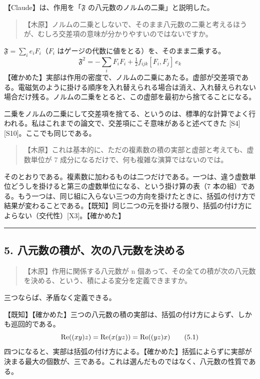 \documentclass[
  a4paper,
]{ltjsarticle}
\begin{document}
【Claude】は、作用を「\(\mathfrak{F}\)
の八元数のノルムの二乗」と説明した。

\begin{quote}
【木原】ノルムの二乗としないで、そのまま八元数の二乗と考えるほうが、むしろ交差項の意味が分かりやすいのではないですか。
\end{quote}

\(\mathfrak{F} = \sum_i e_i F_i\)（\(F_i\)
はゲージの代数に値をとる）を、そのまま二乗する。 \[
\mathfrak{F}^2 = -\sum_i F_iF_i + \tfrac12 f_{ijk}[F_i, F_j]\,e_k \tag{4.1}
\]
【確かめた】実部は作用の密度で、ノルムの二乗にあたる。虚部が交差項である。電磁気のように掛ける順序を入れ替えられる場合は消え、入れ替えられない場合だけ残る。ノルムの二乗をとると、この虚部を最初から捨てることになる。

二乗をノルムの二乗にして交差項を捨てる、というのは、標準的な計算でよく行われる。私はこれまでの論文で、交差項にこそ意味があると述べてきた
{[}S4{]}{[}S10{]}。ここでも同じである。

\begin{quote}
【木原】これは基本的に、ただの複素数の積の実部と虚部と考えても、虚数単位が
7 成分になるだけで、何も複雑な演算ではないのでは。
\end{quote}

そのとおりである。複素数に加わるものは二つだけである。一つは、違う虚数単位どうしを掛けると第三の虚数単位になる、という掛け算の表（7
本の組）である。もう一つは、同じ組に入らない三つの方向を掛けたときに、括弧の付け方で結果が変わることである。【既知】同じ二つの元を掛ける限り、括弧の付け方によらない（交代性）{[}X3{]}。【確かめた】

\begin{center}\rule{0.5\linewidth}{0.5pt}\end{center}

\subsection{5.
八元数の積が、次の八元数を決める}\label{ux516bux5143ux6570ux306eux7a4dux304cux6b21ux306eux516bux5143ux6570ux3092ux6c7aux3081ux308b}

\begin{quote}
【木原】作用に関係する八元数が n
個あって、その全ての積が次の八元数を決める、という、積による変分を定義できますか。
\end{quote}

三つならば、矛盾なく定義できる。

【既知】【確かめた】三つの八元数の積の実部は、括弧の付け方によらず、しかも巡回的である。
\[
{\rm Re}((xy)z) = {\rm Re}(x(yz)) = {\rm Re}((yz)x) \tag{5.1}
\]
四つになると、実部は括弧の付け方による。【確かめた】括弧によらずに実部が決まる最大の個数が、三である。これは選んだものではなく、八元数の性質である。
\end{document}
